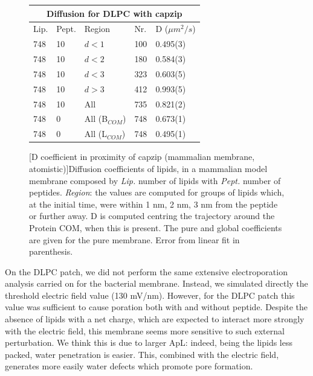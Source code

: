 \begin{figure}[t!]
\centering
 \def\arraystretch{1.6}
\begin{tabular}{lll|ll}
 \multicolumn{5}{c}{\textbf{Diffusion for DLPC with capzip}} \\
 \hline
Lip. & Pept. & Region & Nr. & D ($\mu m^2/s$) \\
 \hline
748 & 10 & $d<1$ & 100 & 0.495(3) \\
748 & 10 & $d<2$ & 180 & 0.584(3) \\
748 & 10 & $d<3$ & 323 & 0.603(5) \\
748 & 10 & $d>3$ & 412 & 0.993(5) \\
748 & 10 & All & 735 & 0.821(2) \\
 \hline
 748 & 0 & All (B$_{COM}$) & 748 & 0.673(1) \\
 748 & 0 & All (L$_{COM}$) & 748 & 0.495(1) \\
 \hline
 \end{tabular}
[D coefficient in proximity of capzip (mammalian membrane, atomistic)]{Diffusion coefficients of lipids, in a mammalian model membrane composed by \emph{Lip.} number of lipids with \emph{Pept.} number of peptides. \emph{Region}: the values are computed for groups of lipids which, at the initial time, were within 1 nm, 2 nm, 3 nm from the peptide or further away. D is computed centring the trajectory around the Protein COM, when this is present. The pure and global coefficients are given for the pure membrane. Error from linear fit in parenthesis.}
\label{table:dlpc_D_space}
\end{figure}

On the DLPC patch, we did not perform the same extensive electroporation analysis carried on for the bacterial membrane. Instead, we simulated directly the threshold electric field value (130 mV/nm). 
%
However, for the DLPC patch this value was sufficient to cause poration both with and without peptide. Despite the absence of lipids with a net charge, which are expected to interact more strongly with the electric field, this membrane seems more sensitive to such external perturbation. We think this is due to larger ApL: indeed, being the lipids less packed, water penetration is easier. This, combined with the electric field, generates more easily water defects which promote pore formation.

